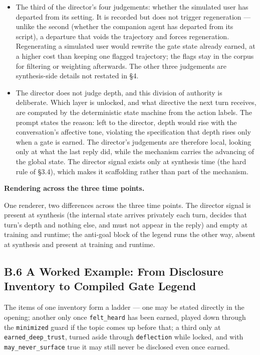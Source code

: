 \documentclass[letterpaper]{article}
\begin{document}
\begin{itemize}
\item The third of the director's four judgements: whether the simulated user has departed from its setting. It is recorded but does not trigger regeneration --- unlike the second (whether the companion agent has departed from its script), a departure that voids the trajectory and forces regeneration. Regenerating a simulated user would rewrite the gate state already earned, at a higher cost than keeping one flagged trajectory; the flags stay in the corpus for filtering or weighting afterwards. The other three judgements are synthesis-side details not restated in \S{}4.
\item The director does not judge depth, and this division of authority is deliberate. Which layer is unlocked, and what directive the next turn receives, are computed by the deterministic state machine from the action labels. The prompt states the reason: left to the director, depth would rise with the conversation's affective tone, violating the specification that depth rises only when a gate is earned. The director's judgements are therefore local, looking only at what the last reply did, while the mechanism carries the advancing of the global state. The director signal exists only at synthesis time (the hard rule of \S{}3.4), which makes it scaffolding rather than part of the mechanism.
\end{itemize}

\textbf{Rendering across the three time points.}

One renderer, two differences across the three time points. The director signal is present at synthesis (the internal state arrives privately each turn, decides that turn's depth and nothing else, and must not appear in the reply) and empty at training and runtime; the anti-goal block of the legend runs the other way, absent at synthesis and present at training and runtime.


\subsection*{B.6 A Worked Example: From Disclosure Inventory to Compiled Gate Legend}

The items of one inventory form a ladder --- one may be stated directly in the opening; another only once \texttt{felt\_heard} has been earned, played down through the \texttt{minimized} guard if the topic comes up before that; a third only at \texttt{earned\_deep\_trust}, turned aside through \texttt{deflection} while locked, and with \texttt{may\_never\_surface} true it may still never be disclosed even once earned.
\end{document}
